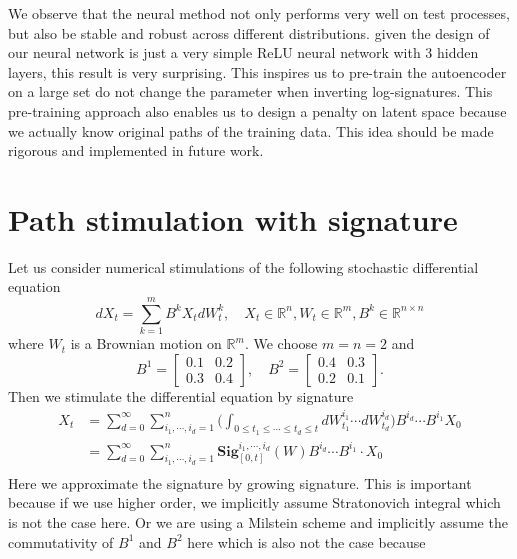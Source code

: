 \documentclass[12pt]{report}
\theoremstyle{definition}
\theoremstyle{remark}
\newcommand{\R}{\mathbb{R}}
\begin{document}
We observe that the neural method not only performs very well on test processes, but also be stable and robust across different distributions. given the design of our neural network is just a very simple ReLU neural network with 3 hidden layers, this result is very surprising. This inspires us to pre-train the autoencoder on a large set do not change the parameter when inverting log-signatures. This pre-training approach also enables us to design a penalty on latent space because we actually know original paths of the training data. This idea should be made rigorous and implemented in future work. 

\section{Path stimulation with signature}
Let us consider numerical stimulations of the following stochastic differential equation
\begin{equation*}
  dX_t = \sum_{k=1}^{m} B^{k}X_{t}dW^{k}_{t},\quad X_{t}\in \mathbb{R}^{n}, W_{t}\in\mathbb{R}^{m}, B^{k} \in \mathbb{R}^{n\times n}
\end{equation*}
where $W_{t}$ is a Brownian motion on $\R^{m}$. We choose $m=n=2$ and 
\begin{equation*}
  B^{1} = \begin{bmatrix}
    0.1& 0.2\\
    0.3& 0.4
  \end{bmatrix},\quad 
  B^{2} = \begin{bmatrix}
    0.4& 0.3\\
    0.2& 0.1
  \end{bmatrix}.
\end{equation*}
Then we stimulate the differential equation by signature 
\begin{equation*}
  \begin{split}
    X_t &= \sum_{d = 0}^{\infty}\sum_{i_{1},\cdots,i_{d} = 1}^{n} \bigg(\int_{0\leq t_{1}\leq\cdots\leq t_{d}\leq t}dW^{i_{1}}_{t_{1}}\cdots dW^{i_{d}}_{t_{d}}\bigg)B^{i_{d}}\cdots B^{i_{1}} X_{0}\\
    &= \sum_{d = 0}^{\infty}\sum_{i_{1},\cdots,i_{d} = 1}^{n} \mathbf{Sig}^{i_{1},\cdots,i_{d}}_{[0,t]}(W) B^{i_{d}}\cdots B^{i_{1}} \cdot X_{0}\\
  \end{split}
\end{equation*}
Here we approximate the signature by growing signature. This is important because if we use higher order, we implicitly assume Stratonovich integral which is not the case here. Or we are using a Milstein scheme and implicitly assume the commutativity of $B^{1}$ and $B^{2}$ here which is also not the case because
\end{document}
